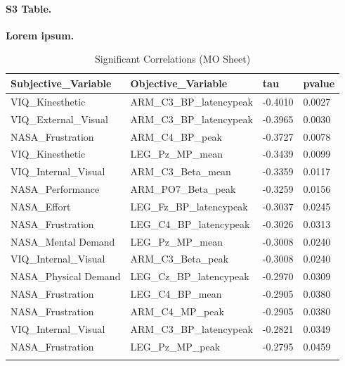 \documentclass[10pt,letterpaper]{article}
\begin{document}
\paragraph*{S3 Table.}
\label{S3_Table}
{\bf Lorem ipsum.} 


\begin{longtable}{@{}llll@{}}

\caption{Significant Correlations (MO Sheet)}
\label{tab:mo_correlations} \\

\toprule
\rowcolor[HTML]{EFEFEF} 
Subjective\_Variable & Objective\_Variable & tau & pvalue \\ \midrule

VIQ\_Kinesthetic & ARM\_C3\_BP\_latencypeak & -0.4010 & 0.0027 \\
\rowcolor[HTML]{EFEFEF} 
VIQ\_External\_Visual & ARM\_C3\_BP\_latencypeak & -0.3965 & 0.0030 \\
NASA\_Frustration & ARM\_C4\_BP\_peak & -0.3727 & 0.0078 \\
\rowcolor[HTML]{EFEFEF} 
VIQ\_Kinesthetic & LEG\_Pz\_MP\_mean & -0.3439 & 0.0099 \\
VIQ\_Internal\_Visual & ARM\_C3\_Beta\_mean & -0.3359 & 0.0117 \\
\rowcolor[HTML]{EFEFEF} 
NASA\_Performance & ARM\_PO7\_Beta\_peak & -0.3259 & 0.0156 \\
NASA\_Effort & LEG\_Fz\_BP\_latencypeak & -0.3037 & 0.0245 \\
\rowcolor[HTML]{EFEFEF} 
NASA\_Frustration & LEG\_C4\_BP\_latencypeak & -0.3026 & 0.0313 \\
NASA\_Mental Demand & LEG\_Pz\_MP\_mean & -0.3008 & 0.0240 \\
\rowcolor[HTML]{EFEFEF} 
VIQ\_Internal\_Visual & ARM\_C3\_Beta\_peak & -0.3008 & 0.0240 \\
NASA\_Physical Demand & LEG\_Cz\_BP\_latencypeak & -0.2970 & 0.0309 \\
\rowcolor[HTML]{EFEFEF} 
NASA\_Frustration & LEG\_C4\_BP\_mean & -0.2905 & 0.0380 \\
NASA\_Frustration & ARM\_C4\_MP\_peak & -0.2905 & 0.0380 \\
\rowcolor[HTML]{EFEFEF} 
VIQ\_Internal\_Visual & ARM\_C3\_BP\_latencypeak & -0.2821 & 0.0349 \\
NASA\_Frustration & LEG\_Pz\_MP\_peak & -0.2795 & 0.0459 \\
\rowcolor[HTML]{EFEFEF} 

\end{longtable}
\end{document}
